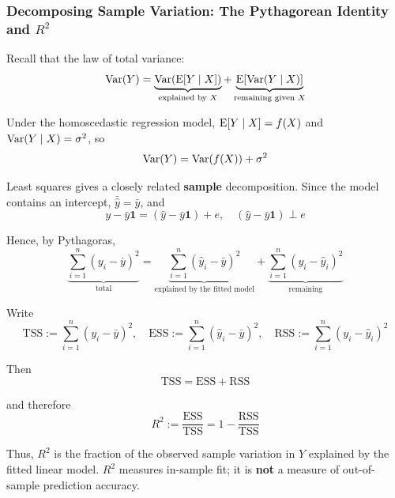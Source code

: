 \subsubsection{Decomposing Sample Variation: The Pythagorean Identity and \texorpdfstring{$R^2$}{R2}}

Recall that the law of total variance:
\begin{equation*}
    \operatorname{Var}(Y) = \underbrace{\operatorname{Var}(\operatorname{E}[Y\mid X])}_{\text{explained by } X} + \underbrace{\operatorname{E}[\operatorname{Var}(Y\mid X)]}_{\text{remaining given } X}
\end{equation*}

Under the homoscedastic regression model, $\operatorname{E}[Y\mid X]=f(X)$ and $\operatorname{Var}(Y\mid X)=\sigma^2$, so
\begin{equation*}
    \operatorname{Var}(Y) = \operatorname{Var}(f(X)) + \sigma^2
\end{equation*}

Least squares gives a closely related \textbf{sample} decomposition. Since the model contains an intercept, $\bar{\hat y}=\bar y$, and
\begin{equation*}
    y - \bar y \bm{1} = (\hat y - \bar y \bm{1}) + e, \quad (\hat y - \bar y \bm{1}) \perp e
\end{equation*}

Hence, by Pythagoras,
\begin{equation*}
    \underbrace{\sum_{i=1}^n (y_i-\bar y)^2}_{\text{total}} = \underbrace{\sum_{i=1}^n (\hat y_i - \bar y)^2}_{\text{explained by the fitted model}} + \underbrace{\sum_{i=1}^n (y_i - \hat y_i)^2}_{\text{remaining}}
\end{equation*}

Write
\begin{equation*}
    \text{TSS} := \sum_{i=1}^n (y_i-\bar y)^2, \quad \text{ESS} := \sum_{i=1}^n (\hat y_i - \bar y)^2, \quad \text{RSS} := \sum_{i=1}^n (y_i - \hat y_i)^2
\end{equation*}

Then
\begin{equation*}
    \text{TSS} = \text{ESS} + \text{RSS}
\end{equation*}

and therefore
\begin{equation*}
    R^2 := \frac{\text{ESS}}{\text{TSS}} = 1 - \frac{\text{RSS}}{\text{TSS}}
\end{equation*}

Thus, $R^2$ is the fraction of the observed sample variation in $Y$ explained by the fitted linear model. $R^2$ measures in-sample fit; it is \textbf{not} a measure of out-of-sample prediction accuracy.

